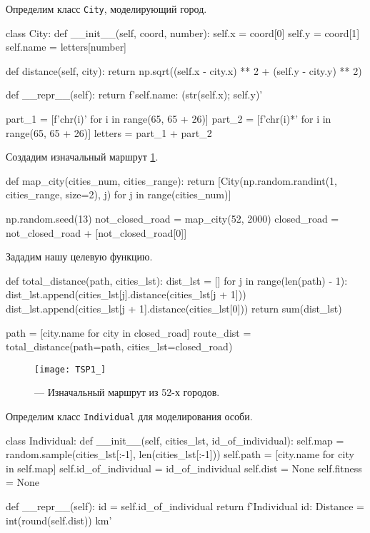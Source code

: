 Определим класс \texttt{City}, моделирующий город.

\begin{pyin}
class City:
  def __init__(self, coord, number):
    self.x = coord[0]
    self.y = coord[1]
    self.name = letters[number]

  def distance(self, city):
    return np.sqrt((self.x - city.x) ** 2 + (self.y - city.y) ** 2)
\end{pyin}

\begin{pyprint}
  def __repr__(self):
    return f'{self.name}: ({str(self.x)}; {self.y})'

part_1 = [f'{chr(i)}' for i in range(65, 65 + 26)]
part_2 = [f'{chr(i)}*' for i in range(65, 65 + 26)]
letters = part_1 + part_2
\end{pyprint}

Создадим изначальный маршрут \ref{img:TSP1_}.
\begin{pyin}
def map_city(cities_num, cities_range):
  return [City(np.random.randint(1, cities_range, size=2), j)
          for j in range(cities_num)]
\end{pyin}

\begin{pyin}
np.random.seed(13)
not_closed_road = map_city(52, 2000)
closed_road = not_closed_road + [not_closed_road[0]]
\end{pyin}

Зададим нашу целевую функцию.
\begin{pyin}
def total_distance(path, cities_lst):
  dist_lst = []
  for j in range(len(path) - 1):
     dist_lst.append(cities_lst[j].distance(cities_lst[j + 1]))
  dist_lst.append(cities_lst[j + 1].distance(cities_lst[0]))
  return sum(dist_lst)
\end{pyin}

\begin{pyin}
path = [city.name for city in closed_road]
route_dist = total_distance(path=path, cities_lst=closed_road)
\end{pyin}

\begin{figure}[h!!]
\centering
\texttt{[image: TSP1\_]}
\caption{ --- Изначальный маршрут из 52-х городов.}
\label{img:TSP1_}
\end{figure}

Определим класс \texttt{Individual} для моделирования особи.
\begin{pyin}
class Individual:
  def __init__(self, cities_lst, id_of_individual):
    self.map = random.sample(cities_lst[:-1],
                             len(cities_lst[:-1]))
    self.path = [city.name for city in self.map]
    self.id_of_individual = id_of_individual
    self.dist = None
    self.fitness = None
\end{pyin}
\begin{pyprint}
  def __repr__(self):
    id = self.id_of_individual
    return f'Individual {id}: Distance = {int(round(self.dist))} km'
\end{pyprint}

